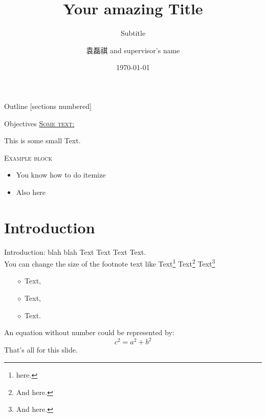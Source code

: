 \documentclass[10pt,xcolor=svgnames]{beamer} %
\title{Your amazing Title}
\author[Name]{袁磊祺 \inst{$\dagger$} and supervisor's name} %
\subtitle{Subtitle}
\institute[uni]{\inst{$\dagger$} 北京大学工学院力学与工程科学系}
\date{\today} %
\begin{document}
{
   \maketitle
}%


\begin{frame}{Outline}
   [sections numbered] %
   \tableofcontents[hideallsubsections] %
\end{frame}

\begin{frame}{Objectives}
   \underline{\textsc{Some text:}}
   \begin{small}
	  This is some small Text.
   \end{small}

   \begin{exampleblock}{\textsc{Example block}}
	  \begin{itemize}
		 \item You know how to do itemize
		 \item Also here
	  \end{itemize}
   \end{exampleblock}
\end{frame}


\section{Introduction}

\begin{frame}[fragile]{Introduction: blah blah} %
   Text Text Text Text. \\You can change the size of the footnote text like  Text\footnote{\small{ here.}} Text\footnote{\large{And here.}} Text\footnote{\tiny{And here.}}
   \begin{itemize} %
	  \item[$\diamond$] Text,
	  \item[$\diamond$] Text,
	  \item[$\diamond$] Text.
   \end{itemize}
   An equation without number could be represented by:
   \begin{equation*}
	  c^{2} = a^{2} + b^{2}
   \end{equation*}
   That's all for this slide.
\end{frame}
\end{document}
